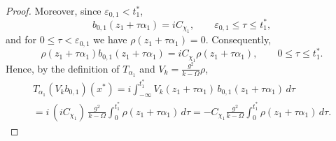 \documentclass[12pt,a4paper]{amsart}
\numberwithin{equation}{section}
\theoremstyle{plain}
\theoremstyle{definition}
\begin{document}
\begin{proof}
Moreover, since $\varepsilon_{0,1}<t_1^*$,
\[
b_{0,1}(z_1+\tau\alpha_1)
=
iC_{\chi_1},
\qquad
\varepsilon_{0,1}\leq \tau\leq t_1^*,
\]
and for $0\leq\tau<\varepsilon_{0,1}$ we have
$\rho(z_1+\tau\alpha_1)=0$. Consequently,
\[
\rho(z_1+\tau\alpha_1)
b_{0,1}(z_1+\tau\alpha_1)
=
iC_{\chi_1}\rho(z_1+\tau\alpha_1),
\qquad 0\leq\tau\leq t_1^*.
\]
Hence, by the definition of $T_{\alpha_1}$
and $V_k=\frac{g^2}{k-\Omega}\rho$,
\begin{multline*}
    T_{\alpha_1}(V_k b_{0,1})(x^*)
    = i\int_{-\infty}^{t_1^*}
       V_k(z_1+\tau\alpha_1)\,b_{0,1}(z_1+\tau\alpha_1)\,d\tau\\
       = i\,(iC_{\chi_1})\,\frac{g^2}{k-\Omega}
       \int_0^{t_1^*}\rho(z_1+\tau\alpha_1)\,d\tau
    = -C_{\chi_1}\frac{g^2}{k-\Omega}
       \int_0^{t_1^*}\rho(z_1+\tau\alpha_1)\,d\tau.
\end{multline*}


\end{proof}
\end{document}
